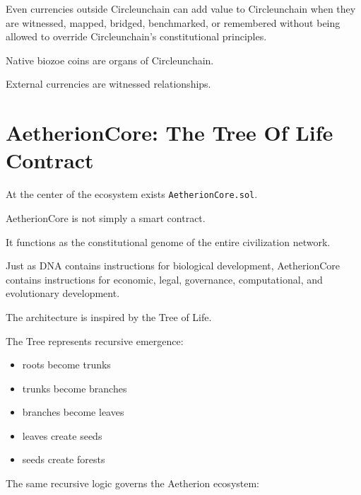 ﻿\documentclass[12pt]{article}
\begin{document}
Even currencies outside Circleunchain can add value to Circleunchain when they are witnessed, mapped, bridged, benchmarked, or remembered without being allowed to override Circleunchain's constitutional principles.

Native biozoe coins are organs of Circleunchain.

External currencies are witnessed relationships.

\section{AetherionCore: The Tree Of Life Contract}


At the center of the ecosystem exists \texttt{AetherionCore.sol}.

AetherionCore is not simply a smart contract.

It functions as the constitutional genome of the entire civilization network.

Just as DNA contains instructions for biological development, AetherionCore contains instructions for economic, legal, governance, computational, and evolutionary development.

The architecture is inspired by the Tree of Life.

The Tree represents recursive emergence:

\begin{itemize}
  \item roots become trunks
\end{itemize}
\begin{itemize}
  \item trunks become branches
\end{itemize}
\begin{itemize}
  \item branches become leaves
\end{itemize}
\begin{itemize}
  \item leaves create seeds
\end{itemize}
\begin{itemize}
  \item seeds create forests
\end{itemize}

The same recursive logic governs the Aetherion ecosystem:
\end{document}
